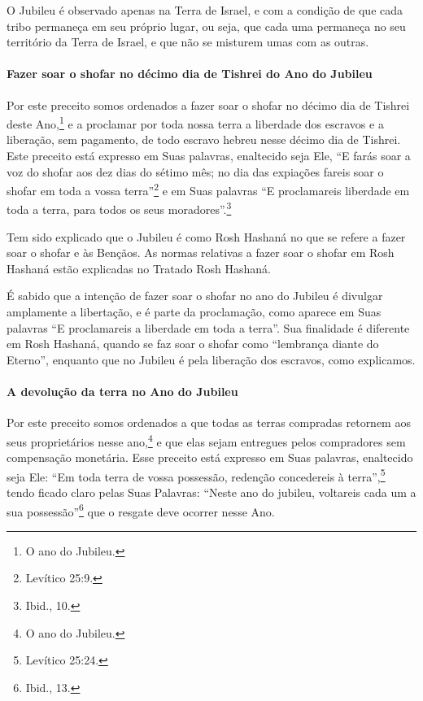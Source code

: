 \begin{multicols}{2}
O Jubileu é observado apenas na Terra de Israel, e com a condição de que
cada tribo permaneça em seu próprio lugar, ou seja, que cada uma
permaneça no seu território da Terra de Israel, e que não se misturem
umas com as outras.

\paragraph{Fazer soar o shofar\starr{} no décimo dia de Tishrei\starr{} do Ano do Jubileu}

Por este preceito somos ordenados a fazer soar o shofar\starr{} no décimo
dia de Tishrei\starr{} deste Ano,\footnote{O ano do Jubileu.} e a proclamar por
toda nossa terra a liberdade dos escravos e a liberação, sem pagamento,
de todo escravo hebreu nesse décimo dia de Tishrei\starr. Este preceito
está expresso em Suas palavras, enaltecido seja Ele, ``E farás soar a
voz do shofar\starr{} aos dez dias do sétimo mês; no dia das expiações fareis
soar o shofar\starr{} em toda a vossa terra''\footnote{Levítico 25:9.} e em Suas
palavras ``E proclamareis liberdade em toda a terra, para todos os seus
moradores''.\footnote{Ibid., 10.}

Tem sido explicado que o Jubileu é como Rosh Hashaná\starr{} no que se refere a
fazer soar o shofar\starr{} e às Bençãos. As normas relativas a fazer soar o
shofar\starr{} em Rosh Hashaná\starr{} estão explicadas no Tratado Rosh Hashaná\starr.

É sabido que a intenção de fazer soar o shofar\starr{} no ano do Jubileu é
divulgar amplamente a libertação, e é parte da proclamação, como aparece
em Suas palavras ``E proclamareis a liberdade em toda a terra''. Sua
finalidade é diferente em Rosh Hashaná\starr, quando se faz soar o shofar\starr{}
como ``lembrança diante do Eterno'', enquanto que no Jubileu é pela
liberação dos escravos, como explicamos.

\paragraph{A devolução da terra no Ano do Jubileu}

Por este preceito somos ordenados a que todas as terras compradas
retornem aos seus proprietários nesse ano,\footnote{O ano do Jubileu.} e que
elas sejam entregues pelos compradores sem compensação monetária. Esse
preceito está expresso em Suas palavras, enaltecido seja Ele: ``Em toda
terra de vossa possessão, redenção concedereis à terra'',\footnote{Levítico
25:24.} tendo ficado claro pelas Suas Palavras: ``Neste ano do jubileu,
voltareis cada um a sua possessão''\footnote{Ibid., 13.} que o resgate deve
ocorrer nesse Ano.


\end{multicols}
